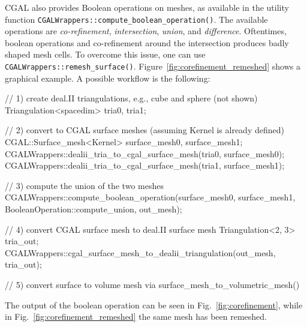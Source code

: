 \documentclass{ansarticle-preprint}
\begin{document}
CGAL also provides Boolean operations on meshes, as available in the
utility function
\texttt{CGALWrappers::\allowbreak{}compute\_boolean\_operation()}. The
available operations are \textit{co-refinement}, \textit{intersection},
\textit{union}, and \textit{difference}. Oftentimes, boolean
operations and co-refinement around the intersection produces
badly shaped mesh cells. To overcome this issue, one can use \texttt{CGALWrappers::\allowbreak{}remesh\_surface()}. Figure~\ref{fig:corefinement_remeshed} shows a graphical example.
A possible workflow is the following:
\begin{c++}
// 1) create deal.II triangulations, e.g., cube and sphere (not shown)  
Triangulation<spacedim> tria0, tria1;

// 2) convert to CGAL surface meshes (assuming Kernel is already defined) 
CGAL::Surface_mesh<Kernel> surface_mesh0, surface_mesh1;
CGALWrappers::dealii_tria_to_cgal_surface_mesh(tria0, surface_mesh0);
CGALWrappers::dealii_tria_to_cgal_surface_mesh(tria1, surface_mesh1);
  
// 3) compute the union of the two meshes
CGALWrappers::compute_boolean_operation(surface_mesh0, surface_mesh1,
  BooleanOperation::compute_union, out_mesh);
                            
// 4) convert CGAL surface mesh to deal.II surface mesh
Triangulation<2, 3>     tria_out;
CGALWrappers::cgal_surface_mesh_to_dealii_triangulation(out_mesh, tria_out);

// 5) convert surface to volume mesh via surface_mesh_to_volumetric_mesh()
  \end{c++}
  The output of the boolean operation can be seen in Fig.~\ref{fig:corefinement}, while in Fig.~\ref{fig:corefinement_remeshed}
  the same mesh has been remeshed.
\end{document}
